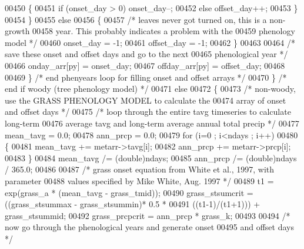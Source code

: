 \begin{DoxyCode}
{{00450                     \{
00451                         \textcolor{keywordflow}{if} (onset\_day > 0) onset\_day--;
00452                         \textcolor{keywordflow}{else} offset\_day++;
00453                     \}
00454                 \}
00455                 \textcolor{keywordflow}{else}
00456                 \{
00457                     \textcolor{comment}{/* leaves never got turned on, this is a non-growth}
00458 \textcolor{comment}{                    year.  This probably indicates a problem with the}
00459 \textcolor{comment}{                    phenology model */}
00460                     onset\_day = -1;
00461                     offset\_day = -1;
00462                 \}
00463 
00464                 \textcolor{comment}{/* save these onset and offset days and go to the next}
00465 \textcolor{comment}{                phenological year */}
00466                 onday\_arr[py] = onset\_day;
00467                 offday\_arr[py] = offset\_day;
00468                 
00469             \} \textcolor{comment}{/* end phenyears loop for filling onset and offset arrays */}
00470         \} \textcolor{comment}{/* end if woody (tree phenology model) */}
00471         \textcolor{keywordflow}{else}
00472         \{
00473             \textcolor{comment}{/* non-woody, use the GRASS PHENOLOGY MODEL to calculate the}
00474 \textcolor{comment}{            array of onset and offset days */}
00475             \textcolor{comment}{/* loop through the entire tavg timeseries to calculate long-term}
00476 \textcolor{comment}{            average tavg and long-term average annual total precip */}
00477             mean\_tavg = 0.0;
00478             ann\_prcp = 0.0;
00479             \textcolor{keywordflow}{for} (i=0 ; i<ndays ; i++)
00480             \{
00481                 mean\_tavg += metarr->tavg[i];
00482                 ann\_prcp += metarr->prcp[i];
00483             \}
00484             mean\_tavg /= (double)ndays;
00485             ann\_prcp /= (double)ndays / 365.0;
00486             
00487             \textcolor{comment}{/* grass onset equation from White et al., 1997, with parameter}
00488 \textcolor{comment}{            values specified by Mike White, Aug. 1997 */}
00489             t1 = exp(grass\_a * (mean\_tavg - grass\_tmid));
00490             grass\_stsumcrit = ((grass\_stsummax - grass\_stsummin)* 0.5 *
00491                 ((t1-1)/(t1+1))) + grass\_stsummid;
00492             grass\_prcpcrit = ann\_prcp * grass\_k;
00493             
00494             \textcolor{comment}{/* now go through the phenological years and generate onset}
00495 \textcolor{comment}{            and offset days */}
}}
\end{DoxyCode}
